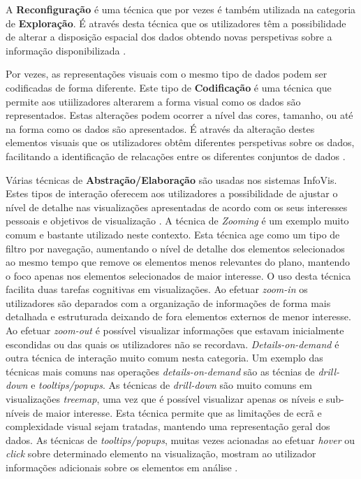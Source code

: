 A \textbf{Reconfiguração} é uma técnica que por vezes é também utilizada na categoria de \textbf{Exploração}. É através desta técnica que os utilizadores têm a possibilidade de alterar a disposição espacial dos dados obtendo novas perspetivas sobre a informação disponibilizada \cite{yi2007toward, figueiras2015towards}.

Por vezes, as representações visuais com o mesmo tipo de dados podem ser codificadas de forma diferente. Este tipo de \textbf{Codificação} é uma técnica que permite aos utiilizadores alterarem a forma visual como os dados são representados. Estas alterações podem ocorrer a nível das cores, tamanho, ou até na forma como os dados são apresentados. É através da alteração destes elementos visuais que os utilizadores obtêm diferentes perspetivas sobre os dados, facilitando a identificação de relacações entre os diferentes conjuntos de dados \cite{yi2007toward}.

Várias técnicas de \textbf{Abstração/Elaboração} são usadas nos sistemas \gls{InfoVis}. Estes tipos de interação oferecem aos utilizadores a possibilidade de ajustar o nível de detalhe nas visualizações apresentadas de acordo com os seus interesses pessoais e objetivos de visualização \cite{yi2007toward, figueiras2015towards}. A técnica de \textit{Zooming} é um exemplo muito comum e bastante utilizado neste contexto. Esta técnica age como um tipo de filtro por navegação, aumentando o nível de detalhe dos elementos selecionados ao mesmo tempo que remove os elementos menos relevantes do plano, mantendo o foco apenas nos elementos selecionados de maior interesse. O uso desta técnica facilita duas tarefas cognitivas em visualizações. Ao efetuar \textit{zoom-in} os utilizadores são deparados com a organização de informações de forma mais detalhada e estruturada deixando de fora elementos externos de menor interesse. Ao efetuar \textit{zoom-out} é possível visualizar informações que estavam inicialmente escondidas ou das quais os utilizadores não se recordava. \textit{Details-on-demand} é outra técnica de interação muito comum nesta categoria. Um exemplo das técnicas mais comuns nas operações \textit{details-on-demand} são as técnias de \textit{drill-down} e \textit{tooltips/popups}. As técnicas de \textit{drill-down} são muito comuns em visualizações \textit{treemap}, uma vez que é possível visualizar apenas os níveis e sub-níveis de maior interesse. Esta técnica permite que as limitações de ecrã e complexidade visual sejam tratadas, mantendo uma representação geral dos dados. As técnicas de \textit{tooltips/popups}, muitas vezes acionadas ao efetuar \textit{hover} ou \textit{click} sobre determinado elemento na visualização, mostram ao utilizador informações adicionais sobre os elementos em análise \cite{figueiras2015towards}.

